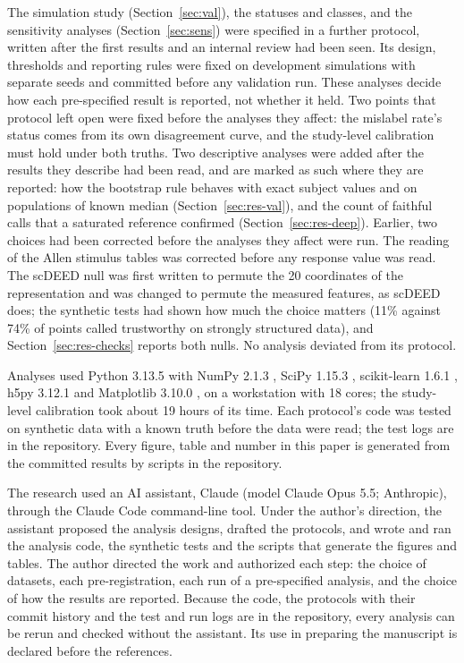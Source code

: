 \documentclass[11pt]{article}
\begin{document}
The simulation study (Section~\ref{sec:val}), the statuses and classes, and the sensitivity analyses (Section~\ref{sec:sens}) were specified in a further protocol, written after the first results and an internal review had been seen.
Its design, thresholds and reporting rules were fixed on development simulations with separate seeds and committed before any validation run.
These analyses decide how each pre-specified result is reported, not whether it held.
Two points that protocol left open were fixed before the analyses they affect: the mislabel rate's status comes from its own disagreement curve, and the study-level calibration must hold under both truths.
Two descriptive analyses were added after the results they describe had been read, and are marked as such where they are reported: how the bootstrap rule behaves with exact subject values and on populations of known median (Section~\ref{sec:res-val}), and the count of faithful calls that a saturated reference confirmed (Section~\ref{sec:res-deep}).
Earlier, two choices had been corrected before the analyses they affect were run.
The reading of the Allen stimulus tables was corrected before any response value was read.
The scDEED null was first written to permute the 20 coordinates of the representation and was changed to permute the measured features, as scDEED does; the synthetic tests had shown how much the choice matters (11\% against 74\% of points called trustworthy on strongly structured data), and Section~\ref{sec:res-checks} reports both nulls.
No analysis deviated from its protocol.

Analyses used Python 3.13.5 with NumPy 2.1.3 \citep{harris2020}, SciPy 1.15.3 \citep{virtanen2020}, scikit-learn 1.6.1 \citep{pedregosa2011}, h5py 3.12.1 and Matplotlib 3.10.0 \citep{hunter2007}, on a workstation with 18 cores; the study-level calibration took about 19 hours of its time.
Each protocol's code was tested on synthetic data with a known truth before the data were read; the test logs are in the repository.
Every figure, table and number in this paper is generated from the committed results by scripts in the repository.

The research used an AI assistant, Claude (model Claude Opus 5.5; Anthropic), through the Claude Code command-line tool.
Under the author's direction, the assistant proposed the analysis designs, drafted the protocols, and wrote and ran the analysis code, the synthetic tests and the scripts that generate the figures and tables.
The author directed the work and authorized each step: the choice of datasets, each pre-registration, each run of a pre-specified analysis, and the choice of how the results are reported.
Because the code, the protocols with their commit history and the test and run logs are in the repository, every analysis can be rerun and checked without the assistant.
Its use in preparing the manuscript is declared before the references.
\end{document}
